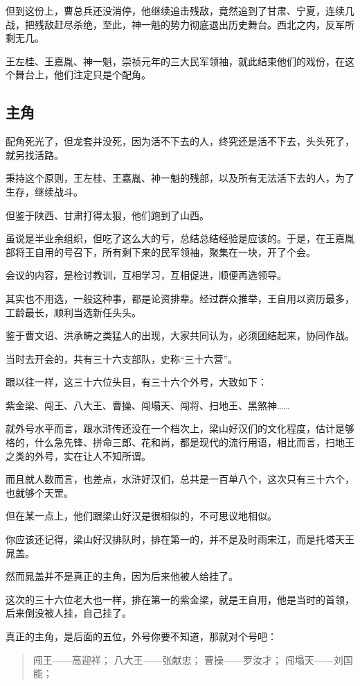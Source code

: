 \begin{multicols}{\theparacolNo}
		但到这份上，曹总兵还没消停，他继续追击残敌，竟然追到了甘肃、宁夏，连续几战，把残敌赶尽杀绝，至此，神一魁的势力彻底退出历史舞台。西北之内，反军所剩无几。

		王左桂、王嘉胤、神一魁，崇祯元年的三大民军领袖，就此结束他们的戏份，在这个舞台上，他们注定只是个配角。

		\subsection{主角}
		配角死光了，但龙套并没死，因为活不下去的人，终究还是活不下去，头头死了，就另找活路。

		秉持这个原则，王左桂、王嘉胤、神一魁的残部，以及所有无法活下去的人，为了生存，继续战斗。

		但鉴于陕西、甘肃打得太狠，他们跑到了山西。

		虽说是半业余组织，但吃了这么大的亏，总结总结经验是应该的。于是，在王嘉胤部将王自用的号召下，所有剩下来的民军领袖，聚集在一块，开了个会。

		会议的内容，是检讨教训，互相学习，互相促进，顺便再选领导。

		其实也不用选，一般这种事，都是论资排辈。经过群众推举，王自用以资历最多，工龄最长，顺利当选新任头头。

		鉴于曹文诏、洪承畴之类猛人的出现，大家共同认为，必须团结起来，协同作战。

		当时去开会的，共有三十六支部队，史称“三十六营”。

		跟以往一样，这三十六位头目，有三十六个外号，大致如下：

		紫金梁、闯王、八大王、曹操、闯塌天、闯将、扫地王、黑煞神……

		就外号水平而言，跟水浒传还没在一个档次上，梁山好汉们的文化程度，估计是够格的，什么急先锋、拼命三郎、花和尚，都是现代的流行用语，相比而言，扫地王之类的外号，实在让人不知所谓。

		而且就人数而言，也差点，水浒好汉们，总共是一百单八个，这次只有三十六个，也就够个天罡。

		但在某一点上，他们跟梁山好汉是很相似的，不可思议地相似。

		你应该还记得，梁山好汉排队时，排在第一的，并不是及时雨宋江，而是托塔天王晁盖。

		然而晁盖并不是真正的主角，因为后来他被人给挂了。

		这次的三十六位老大也一样，排在第一的紫金梁，就是王自用，他是当时的首领，后来倒没被人挂，自己挂了。

		真正的主角，是后面的五位，外号你要不知道，那就对个号吧：
		{\footnotesize \begin{quote}
			闯王——高迎祥；
			八大王——张献忠；
			曹操——罗汝才；
			闯塌天——刘国能；
		\end{quote}}


\end{multicols}
